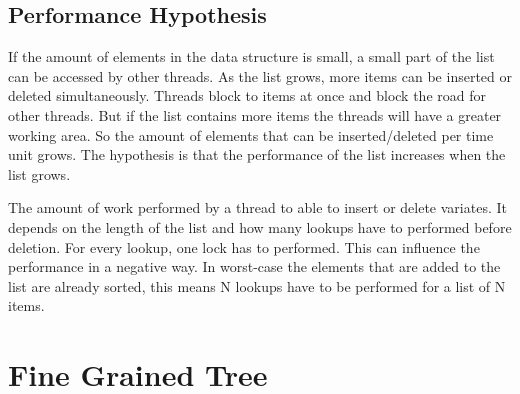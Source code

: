 \documentclass[10pt,a4paper]{article}
\begin{document}
\subsection{Performance Hypothesis}
If the amount of elements in the data structure is small, a small part of the
list can be accessed by other threads. As the list grows, more items can be 
inserted or deleted simultaneously. Threads block to items at once and block
the road for other threads. But if the list contains more items the threads
will have a greater working area. So the amount of elements that can be inserted/deleted 
per time unit grows.
The hypothesis is that the performance of the list increases when the list 
grows. 

The amount of work performed by a thread to able to insert or delete variates.
It depends on the length of the list and how many lookups have to performed
before deletion. For every lookup, one lock has to performed. This can
influence the performance in a negative way. In worst-case the elements that
are added to the list are already sorted, this means N lookups have to be
performed for a list of N items.

\section{Fine Grained Tree}
\end{document}
